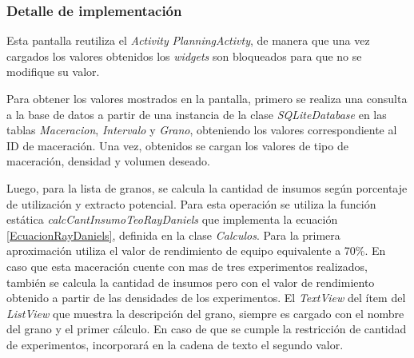             \subsubsection{Detalle de implementación}
            \par Esta pantalla reutiliza el \textit{Activity} \textit{PlanningActivty}, de manera que una vez cargados los valores obtenidos los \textit{widgets} son bloqueados para que no se modifique su valor. 
            \par Para obtener los valores mostrados en la pantalla, primero se realiza una consulta a la base de datos a partir de una instancia de la clase \textit{SQLiteDatabase} en las tablas \textit{Maceracion}, \textit{Intervalo} y \textit{Grano}, obteniendo los valores correspondiente al ID de maceración. Una vez, obtenidos se cargan los valores de tipo de maceración, densidad y volumen deseado. 
            
            \par Luego, para la lista de granos, se calcula la cantidad de insumos según porcentaje de utilización y extracto potencial. Para esta operación se utiliza la función estática \textit{calcCantInsumoTeoRayDaniels} que implementa la ecuación \ref{EcuacionRayDaniels}, definida en la clase \textit{Calculos}. Para la primera aproximación utiliza el valor de rendimiento de equipo equivalente a 70\%. En caso que esta maceración cuente con mas de tres experimentos realizados, también se calcula la cantidad de insumos pero con el valor de rendimiento obtenido a partir de las densidades de los experimentos. El \textit{TextView} del ítem del \textit{ListView} que muestra la descripción del grano, siempre es cargado con el nombre del grano y el primer cálculo. En caso de que se cumple la restricción de cantidad de experimentos, incorporará en la cadena de texto el segundo valor.
            
